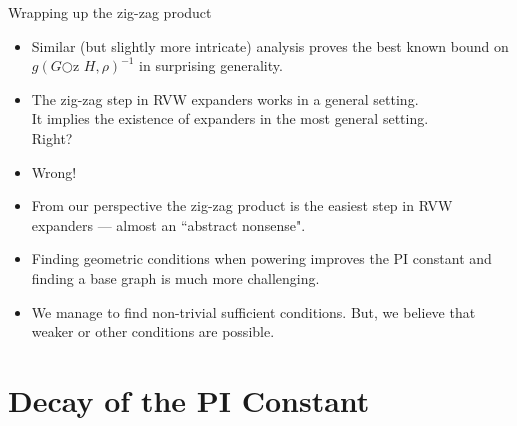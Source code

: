 \documentclass[compress]{beamer}
\newcommand{\oz}{{\bigcirc\!\!\!\!\mathrm{z}\,\,}}
\begin{document}
\begin{frame}{Wrapping up the zig-zag product}

\begin{itemize}[<+->]
\item Similar (but slightly more intricate)  analysis  proves the best known bound on $g(G\oz H, \rho)^{-1}$ in surprising generality.

\item The zig-zag  step in RVW expanders works in a general setting.\\
It implies  the existence of  expanders in the most general setting.\\
 {\color{blue}Right?}

\item \alert{Wrong!}

\item From our perspective the zig-zag product is the easiest step in RVW expanders --- almost an ``abstract nonsense".

\item Finding geometric conditions when powering improves the PI constant and finding a base graph is much more challenging.

\item We manage to find non-trivial sufficient conditions.
\alert{But}, we believe that weaker or other conditions are possible.
\end{itemize}
\end{frame}


\section{Decay of the PI Constant}
\end{document}
